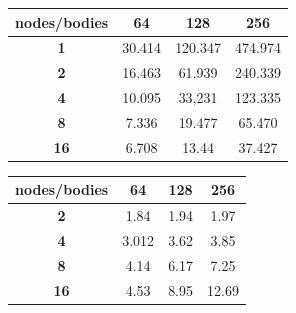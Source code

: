 \documentclass[a4paper]{article}
\begin{document}
\begin{minipage}[b]{.40\textwidth}
  \centering
\begin{tabular}{c|c|c|c}
\textbf{nodes/bodies} & \textbf{64} & \textbf{128} & \textbf{256} \\ \hline
\textbf{1}            & 30.414      & 120.347      & 474.974      \\ \hline
\textbf{2}            & 16.463      & 61.939       & 240.339      \\ \hline
\textbf{4}            & 10.095      & 33,231       & 123.335      \\ \hline
\textbf{8}            & 7.336       & 19.477       & 65.470       \\ \hline
\textbf{16}           & 6.708       & 13.44        & 37.427      
\end{tabular}
  \label{tab:R1_t1}
\end{minipage} \qquad
\begin{minipage}[b]{.40\textwidth}
  \centering
\begin{tabular}{c|c|c|c}
\textbf{nodes/bodies} & \textbf{64} & \textbf{128} & \textbf{256} \\ \hline
\textbf{2}            & 1.84        & 1.94         & 1.97         \\ \hline
\textbf{4}            & 3.012       & 3.62         & 3.85         \\ \hline
\textbf{8}            & 4.14        & 6.17         & 7.25         \\ \hline
\textbf{16}           & 4.53        & 8.95         & 12.69       
\end{tabular}
  \label{tab:R1_t2}
\end{minipage}
\end{document}
